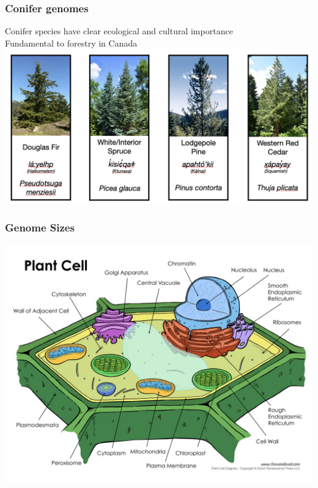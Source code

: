 \documentclass{beamer}
\begin{document}
\begin{frame}
	\frametitle{Conifer genomes}
	
	Conifer species have clear ecological and cultural importance\\
		
	Fundamental to forestry in Canada\\
	
			\centering	\includegraphics[keepaspectratio, width  =1\textwidth]{img/conifers}\\

	
\end{frame}


\begin{frame}
\frametitle{Genome Sizes}
			\centering	\includegraphics[keepaspectratio, width  =1\textwidth]{img/plantCell}\\
\end{frame}
	
\end{document}
